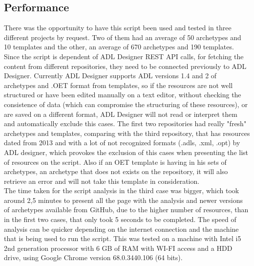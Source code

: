\documentclass[mim_thesis.tex]{subfiles}
\begin{document}
\subsection{Performance}

There was the opportunity to have this script been used and tested in three different projects by request. Two of them had an average of 50 archetypes and 10 templates and the other, an average of 670 archetypes and 190 templates. Since the script is dependent of ADL Designer REST API calls, for fetching the content from different repositories, they need to be connected previously to ADL Designer. Currently ADL Designer supports ADL versions 1.4 and 2 of archetypes and .OET format from templates, so if the resources are not well structured or have been edited manually on a text editor, without checking the consistence of data (which can compromise the structuring of these resources), or are saved on a different format, ADL Designer will not read or interpret them and automatically exclude this cases. The first two repositories had really "fresh" archetypes and templates, comparing with the third repository, that has resources dated from 2013 and with a lot of not recognized formats (.adls, .xml, .opt) by ADL designer, which provokes the exclusion of this cases when presenting the list of resources on the script. Also if an OET template is having in his sets of archetypes, an archetype that does not exists on the repository, it will also retrieve an error and will not take this template in consideration. \\

The time taken for the script analysis in the third case was bigger, which took around 2,5 minutes to present all the page with the analysis and newer versions of archetypes available from GitHub, due to the higher number of resources, than in the first two cases, that only took 5 seconds to be completed. The speed of analysis can be quicker depending on the internet connection and the machine that is being used to run the script. This was tested on a machine with Intel i5 2nd generation processor with 6 GB of RAM with WI-FI access and a HDD drive, using Google Chrome version 68.0.3440.106 (64 bits).
\end{document}
